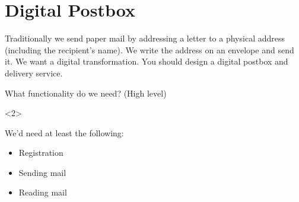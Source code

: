 \mode*

\section{Digital Postbox}

Traditionally we send paper mail by addressing a letter to a physical address 
(including the recipient's name).
We write the address on an envelope and send it.
We want a digital transformation.
You should design a digital postbox and delivery service.


\begin{frame}
\begin{exercise}[Functionality]
  What functionality do we need? (High level)
\end{exercise}

\begin{onlyenv}<2>
  \begin{solution}
    We'd need at least the following:
    \begin{itemize}
      \item Registration
      \item Sending mail
      \item Reading mail
    \end{itemize}
  \end{solution}
\end{onlyenv}
\end{frame}

